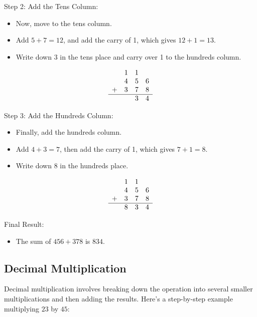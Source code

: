 \vspace{\baselineskip}\par
Step 2: Add the Tens Column:
  \begin{itemize}
       \item Now, move to the tens column.
       \item Add \( 5 + 7 = 12 \), and add the carry of 1, which gives \( 12 + 1 = 13 \).
       \item Write down 3 in the tens place and carry over 1 to the hundreds column.
   \end{itemize}
\[
\begin{array}{cccc}
    & 1 & 1 & \\ %
    & 4 & 5 & 6 \\
  + & 3 & 7 & 8 \\
  \hline
    & & 3 & 4 \\
\end{array}
\]

\vspace{\baselineskip}\par
Step 3: Add the Hundreds Column:
  \begin{itemize}
       \item Finally, add the hundreds column.
       \item Add \( 4 + 3 = 7 \), then add the carry of 1, which gives \( 7 + 1 = 8 \).
       \item Write down 8 in the hundreds place.
   \end{itemize}
\[
\begin{array}{cccc}
    & 1 & 1 & \\ %
    & 4 & 5 & 6 \\
  + & 3 & 7 & 8 \\
  \hline
    & 8 & 3 & 4 \\
\end{array}
\]

\vspace{\baselineskip}\par
Final Result:
  \begin{itemize}
       \item The sum of \( 456 + 378 \) is \( 834 \).
   \end{itemize}



\subsection{Decimal Multiplication}
Decimal multiplication involves breaking down the operation into several smaller multiplications and then adding the results. Here’s a step-by-step example multiplying \( 23 \) by \( 45 \):


